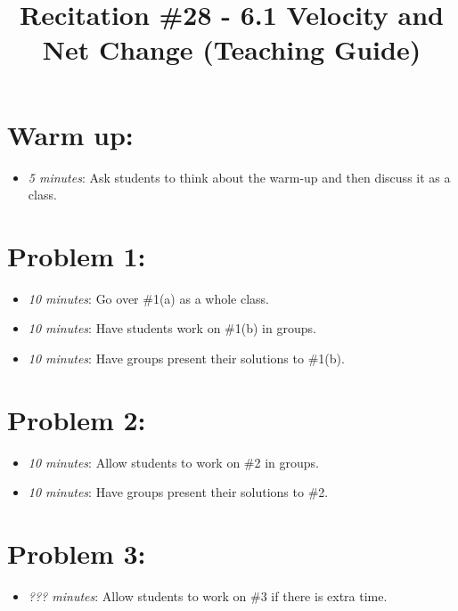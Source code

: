 \documentclass[handout,nooutcomes]{ximera}
\title{Recitation \#28 - 6.1 Velocity and Net Change (Teaching Guide)}
\begin{document}
\begin{abstract}		\end{abstract}
\maketitle


\section*{Warm up:} 
	
	\begin{itemize}
	
	\item  \emph{5 minutes}:  Ask students to think about the warm-up and then discuss it as a class.
	
	
	
	\end{itemize}


\section*{Problem 1:}

	\begin{itemize}
	
	\item  \emph{10 minutes}:  Go over \#1(a) as a whole class.
	
	\item  \emph{10 minutes}:  Have students work on \#1(b) in groups.
	
	\item  \emph{10 minutes}:  Have groups present their solutions to \#1(b).
	
	\end{itemize}



\section*{Problem 2:}

	\begin{itemize}
	
	\item  \emph{10 minutes}:  Allow students to work on \#2 in groups.  
		
	\item  \emph{10 minutes}:  Have groups present their solutions to \#2.
			
	\end{itemize}
	
	
	
\section*{Problem 3:}

	\begin{itemize}
	
	\item  \emph{??? minutes}:  Allow students to work on \#3 if there is extra time.
	
	\end{itemize}
	



	
	
	

	
	

	
	
	

	
	
	
\end{document}
